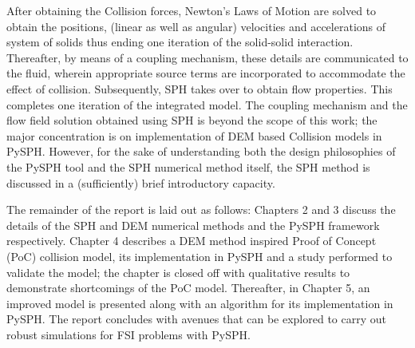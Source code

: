 After obtaining the Collision forces, Newton's Laws of Motion are solved to obtain the positions, (linear as well as angular) velocities and accelerations of system of solids thus ending one iteration of the solid-solid interaction. Thereafter, by means of a coupling mechanism, these details are communicated to the fluid, wherein appropriate source terms are incorporated to accommodate the effect of collision. Subsequently, SPH takes over to obtain flow properties. This completes one iteration of the integrated model. The coupling mechanism and the flow field solution obtained using SPH is beyond the scope of this work; the major concentration is on implementation of DEM based Collision models in PySPH. However, for the sake of understanding both the design philosophies of the PySPH tool and the SPH numerical method itself, the SPH method is discussed in a (sufficiently) brief introductory capacity.

The remainder of the report is laid out as follows: Chapters 2 and 3 discuss the details of the SPH and DEM numerical methods and the PySPH framework respectively. Chapter 4 describes a DEM method inspired Proof of Concept (PoC) collision model, its implementation in PySPH and a study performed to validate the model; the chapter is closed off with qualitative results to demonstrate shortcomings of the PoC model. Thereafter, in Chapter 5, an improved model is presented along with an algorithm for its implementation in PySPH. The report concludes with avenues that can be explored to carry out robust simulations for FSI problems with PySPH.